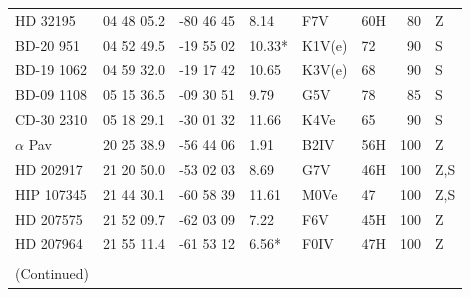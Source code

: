 \documentclass[11pt,twoside]{book}
\begin{document}
\begin{table}[]
{\begin{tabular}{lcclllrl}
HD 32195    &04 48 05.2  &     -80 46 45&    \hspace{2mm}8.14 &F7V  & 60H&80 &Z\\
BD-20 951   &04 52 49.5  &   -19 55 02&         10.33* &      K1V(e) & 72&90&S\\
BD-19 1062  &04 59 32.0  &   -19 17 42&         10.65 &      K3V(e) & 68&90&S\\
BD-09 1108  &05 15 36.5  &   -09 30 51&    \hspace{2mm}9.79 & G5V   & 78&85 &S\\
CD-30 2310  &05 18 29.1  &   -30 01 32&         11.66 &      K4Ve   & 65&90&S\\
$\alpha$ Pav &20 25 38.9&    -56 44 06&      \hspace{2mm}1.91  &     B2IV&56H&100&Z\\
HD 202917   &21 20 50.0&    -53 02 03&      \hspace{2mm}8.69 &      G7V  &46H&100&Z,S\\
HIP 107345   &21 44 30.1&    -60 58 39&       11.61 &      M0Ve     &47&100&Z,S\\
HD 207575    &21 52 09.7&    -62 03 09 &     \hspace{2mm}7.22 &    F6V&45H&100&Z\\
HD 207964    &21 55 11.4&    -61 53 12 &     \hspace{2mm}6.56*&     F0IV   &47H&100&Z\\
\\
\smallskip
(Continued)
\end{tabular}
}
\end{table}
\end{document}
